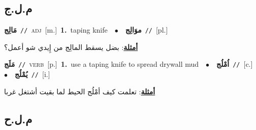 \documentclass[10pt,a4paper,twoside]{article} %
\begin{document}
\begin{multicols}{2}
\vspace{-3mm}
\subsection*{\color{blue}\foreignlanguage{arabic}{م.ل.ج}\color{blue}{}} 

{\setlength\topsep{0pt}\textbf{\foreignlanguage{arabic}{مَالِج}}\ {\color{gray}\texttt{//}\color{black}}\ \textsc{adj}\ [m.]\ \textbf{1.}~taping knife\ \ $\bullet$\ \ \setlength\topsep{0pt}\textbf{\foreignlanguage{arabic}{موَالِج}}\ {\color{gray}\texttt{//}\color{black}}\ [pl.]\  \begin{flushright}\color{gray}\foreignlanguage{arabic}{\textbf{\underline{\foreignlanguage{arabic}{أمثلة}}}: بضل يسقط المالِج من إِيدي شو أعمل؟}\end{flushright}\color{black}} \vspace{2mm}

{\setlength\topsep{0pt}\textbf{\foreignlanguage{arabic}{مَلَج}}\ {\color{gray}\texttt{//}\color{black}}\ \textsc{verb}\ [p.]\ \textbf{1.}~use a taping knife to spread drywall mud\ \ $\bullet$\ \ \setlength\topsep{0pt}\textbf{\foreignlanguage{arabic}{اُمْلُج}}\ {\color{gray}\texttt{//}\color{black}}\ [c.]\ \ $\bullet$\ \ \setlength\topsep{0pt}\textbf{\foreignlanguage{arabic}{يُمْلُج}}\ {\color{gray}\texttt{//}\color{black}}\ [i.]\  \begin{flushright}\color{gray}\foreignlanguage{arabic}{\textbf{\underline{\foreignlanguage{arabic}{أمثلة}}}: تعلمت كيف أمْلُج الحيط لما بقيت أشتغل غربا}\end{flushright}\color{black}} \vspace{2mm}

\vspace{-3mm}
\subsection*{\color{blue}\foreignlanguage{arabic}{م.ل.ح}\color{blue}{}} 


\end{multicols}
\end{document}
